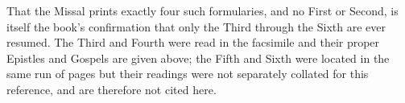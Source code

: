 That the Missal prints exactly four such formularies, and no First or Second, is itself the
book's confirmation that only the Third through the Sixth are ever resumed. The Third and Fourth
were read in the facsimile and their proper Epistles and Gospels are given above; the Fifth and
Sixth were located in the same run of pages but their readings were not separately collated for
this reference, and are therefore not cited here.
